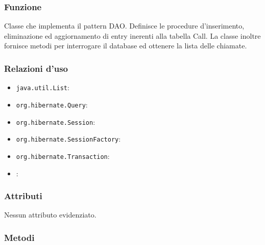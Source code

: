 
\subsubsection*{Funzione}
Classe che implementa il pattern DAO. Definisce le procedure d’inserimento, eliminazione ed aggiornamento di entry inerenti alla tabella Call. La classe inoltre fornisce metodi per interrogare il database ed ottenere la lista delle chiamate.

\subsubsection*{Relazioni d'uso}

\begin{itemize}
	\item \texttt{java.util.List}:
	\item \texttt{org.hibernate.Query}:
	\item \texttt{org.hibernate.Session}:
	\item \texttt{org.hibernate.SessionFactory}:
	\item \texttt{org.hibernate.Transaction}:
	\item {}:
\end{itemize}

\subsubsection*{Attributi}

Nessun attributo evidenziato.

\subsubsection*{Metodi}

